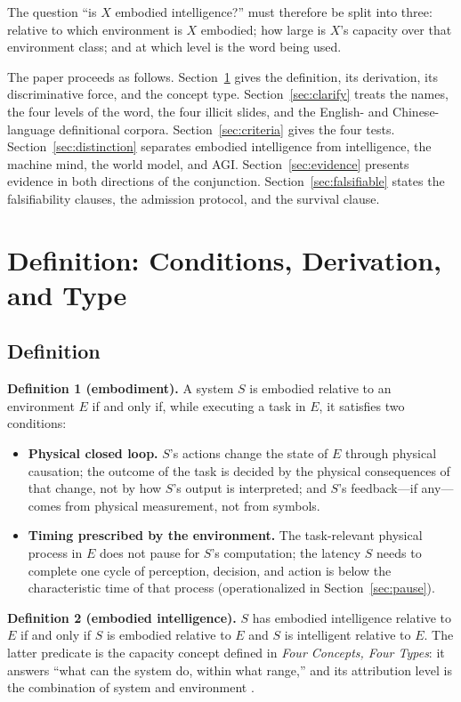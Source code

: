 \documentclass[10pt]{article}
\begin{document}
The question ``is $X$ embodied intelligence?'' must therefore be split into three: relative to which environment is $X$ embodied; how large is $X$'s capacity over that environment class; and at which level is the word being used.

The paper proceeds as follows. Section~\ref{sec:definition} gives the definition, its derivation, its discriminative force, and the concept type. Section~\ref{sec:clarify} treats the names, the four levels of the word, the four illicit slides, and the English- and Chinese-language definitional corpora. Section~\ref{sec:criteria} gives the four tests. Section~\ref{sec:distinction} separates embodied intelligence from intelligence, the machine mind, the world model, and AGI. Section~\ref{sec:evidence} presents evidence in both directions of the conjunction. Section~\ref{sec:falsifiable} states the falsifiability clauses, the admission protocol, and the survival clause.

\section{Definition: Conditions, Derivation, and Type}\label{sec:definition}

\subsection{Definition}\label{sec:def}

\textbf{Definition 1 (embodiment).} A system $S$ is embodied relative to an environment $E$ if and only if, while executing a task in $E$, it satisfies two conditions:

\begin{itemize}
\item[\textbf{(E1)}]\textbf{Physical closed loop.} $S$'s actions change the state of $E$ through physical causation; the outcome of the task is decided by the physical consequences of that change, not by how $S$'s output is interpreted; and $S$'s feedback---if any---comes from physical measurement, not from symbols.
\item[\textbf{(E2)}]\textbf{Timing prescribed by the environment.} The task-relevant physical process in $E$ does not pause for $S$'s computation; the latency $S$ needs to complete one cycle of perception, decision, and action is below the characteristic time of that process (operationalized in Section~\ref{sec:pause}).
\end{itemize}

\textbf{Definition 2 (embodied intelligence).} $S$ has embodied intelligence relative to $E$ if and only if $S$ is embodied relative to $E$ and $S$ is intelligent relative to $E$. The latter predicate is the capacity concept defined in \textit{Four Concepts, Four Types}: it answers ``what can the system do, within what range,'' and its attribution level is the combination of system and environment \cite{yu2026four}.
\end{document}
